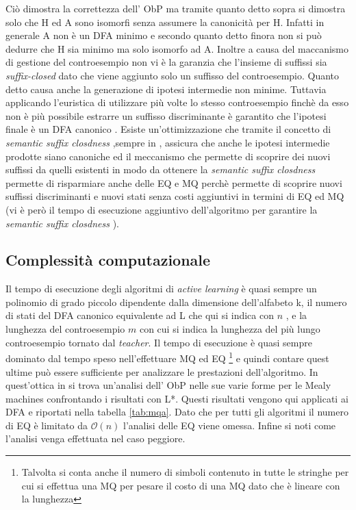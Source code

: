 Ciò dimostra la correttezza dell' \ac{ObP} ma tramite quanto detto sopra si dimostra solo che \ac{H} ed A sono isomorfi senza assumere la canonicità per \ac{H}. Infatti in generale  A non è un \ac{DFA} minimo e secondo quanto detto finora non si può dedurre che \ac{H} sia minimo ma solo isomorfo  ad A. Inoltre a causa del maccanismo di gestione del controesempio non vi è la garanzia che l'insieme di suffissi sia \textit{suffix-closed} dato che viene aggiunto solo un suffisso del controesempio. Quanto detto causa anche la generazione di ipotesi intermedie non minime. Tuttavia applicando l'euristica di utilizzare più volte lo stesso controesempio finchè da esso non è più possibile estrarre un suffisso discriminante è garantito che l'ipotesi finale è un \ac{DFA} canonico \cite[p. 25]{Stef11}. Esiste un'ottimizzazione che tramite  il concetto di \textit{semantic suffix closdness} ,sempre in \cite{Stef11} , assicura che anche le ipotesi intermedie prodotte siano canoniche ed il meccanismo che permette di scoprire dei nuovi suffissi da quelli esistenti in modo da ottenere la \textit{semantic suffix closdness} permette di risparmiare anche delle \ac{EQ} e \ac{MQ} perchè permette di scoprire nuovi suffissi discriminanti e nuovi stati senza costi aggiuntivi in termini di \ac{EQ} ed \ac{MQ} (vi è però il tempo di esecuzione aggiuntivo dell'algoritmo per garantire la \textit{semantic suffix closdness} ).


\subsection{Complessità computazionale}
Il tempo di esecuzione degli algoritmi di \textit{active learning} è quasi sempre un polinomio di grado piccolo dipendente dalla dimensione dell'alfabeto k, il numero di stati  del \ac{DFA} canonico  equivalente ad \ac{L} che qui si indica con $n$ , e la lunghezza del controesempio $m$ con cui si indica la lunghezza del più lungo controesempio tornato dal \textit{teacher}. Il tempo di esecuzione è quasi sempre dominato dal tempo speso nell'effettuare  \ac{MQ} ed \ac{EQ} \footnote{Talvolta si conta anche il numero di simboli contenuto in tutte le stringhe per cui si effettua una \ac{MQ} per pesare il costo di una \ac{MQ} dato che è lineare con la lunghezza} e quindi contare quest ultime può essere sufficiente per analizzare le prestazioni dell'algoritmo. In quest'ottica in \cite[p. 20]{Howar12} si trova un'analisi dell' \ac{ObP} nelle sue varie forme per le  Mealy machines confrontando i risultati con L*. Questi risultati vengono qui applicati ai \ac{DFA} e riportati nella tabella \ref{tab:mqa}. Dato che per tutti gli algoritmi il numero di \ac{EQ} è limitato da $\mathcal{O}(n)$ l'analisi delle \ac{EQ} viene omessa. Infine si noti come l'analisi venga effettuata nel caso peggiore.

